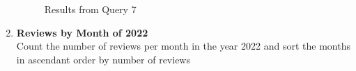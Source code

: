 \documentclass{Configuration_Files/PoliMi3i_thesis}
\begin{document}
\begin{enumerate}
\begin{verbatim}
    \end{verbatim}


\begin{figure}[H]
    \centering
    \quad
        \caption{Results from Query 7}

\end{figure}

    \item \textbf{Reviews by Month of 2022} \\
    Count the number of reviews per month in the year 2022 and sort the months in ascendant order by number of reviews


\end{enumerate}
\end{document}
